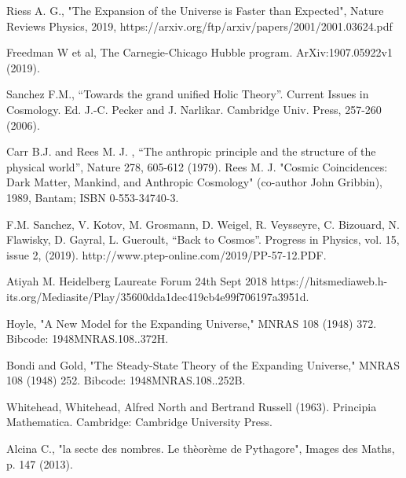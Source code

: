\documentclass[a4paper,9pt]{article}
\begin{document}
  
\begin{thebibliography}{99}


 Riess A. G., "The Expansion of the Universe is Faster than Expected", Nature Reviews Physics, 2019, https://arxiv.org/ftp/arxiv/papers/2001/2001.03624.pdf

 Freedman W et al, The Carnegie-Chicago Hubble program. ArXiv:1907.05922v1 (2019).


 Sanchez F.M., “Towards the grand unified Holic Theory”. Current Issues in Cosmology. Ed. J.-C. Pecker and J. Narlikar. Cambridge Univ. Press, 257-260 (2006). 

 Carr B.J. and Rees M. J. , “The anthropic principle and the structure of the physical world”, Nature 278, 605-612 (1979). Rees M. J. "Cosmic Coincidences: Dark Matter, Mankind, and Anthropic Cosmology" (co-author John Gribbin), 1989, Bantam; ISBN 0-553-34740-3.

 F.M. Sanchez, V. Kotov, M. Grosmann, D. Weigel, R. Veysseyre, C. Bizouard, N. Flawisky, D. Gayral, L. Gueroult, ``Back to Cosmos''. Progress in Physics, vol. 15, issue 2, (2019). http://www.ptep-online.com/2019/PP-57-12.PDF.

 Atiyah M. Heidelberg Laureate Forum 24th Sept 2018 https://hitsmediaweb.h-its.org/Mediasite/Play/35600dda1dec419cb4e99f706197a3951d.

  Hoyle, "A New Model for the Expanding Universe," MNRAS 108 (1948) 372. Bibcode: 1948MNRAS.108..372H.

 Bondi and Gold, "The Steady-State Theory of the Expanding Universe," MNRAS 108 (1948) 252. Bibcode: 1948MNRAS.108..252B.

 Whitehead, Whitehead, Alfred North and Bertrand Russell (1963). Principia Mathematica. Cambridge: Cambridge University Press.

 Alcina C., "la secte des nombres. Le thèorème de Pythagore", Images des Maths, p. 147 (2013).


\end{thebibliography}
\end{document}
